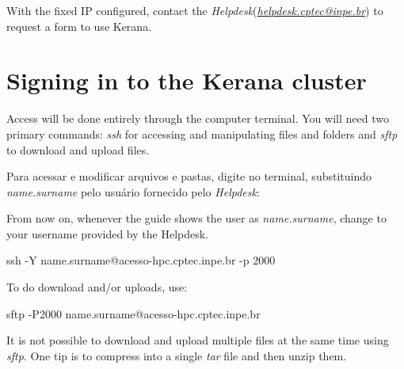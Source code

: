 \noindent With the fixed IP configured, contact the \textit{Helpdesk}(\textcolor{bleu_cite}{\href{helpdesk.cptec@inpe.br}{\textit{helpdesk.cptec@inpe.br}}}) to request a form 
to use Kerana.
\bigskip

\section{Signing in to the Kerana cluster}\label{keranaacess}
\bigskip

\noindent Access will be done entirely through the computer terminal. You will need two primary commands: \textit{ssh} for accessing and manipulating files and folders and 
\textit{sftp} to download and upload files.
\bigskip

\noindent Para acessar e modificar arquivos e pastas, digite no terminal, substituindo \textit{name.surname} pelo usuário fornecido pelo \textit{Helpdesk}:
\bigskip

\begin{tcolorbox}[enhanced,
  grow to left by   = 0cm,
  grow to right by  = 0cm,
  enlarge top by    = 0cm,
  enlarge bottom by = 0cm,
  tcbox raise base,
  boxrule           = 1.0pt,
  left              = 18mm,
  colframe          = red!50!black,coltext=red!25!black,colback=red!10!white,
  overlay           = {\begin{tcbclipinterior}\fill[red!75!blue!50!white] (frame.south west)
    rectangle node[text=white,font=\sffamily\bfseries\footnotesize,rotate=0] {WARNING} ([xshift=18mm]frame.north west);\end{tcbclipinterior}}]
    From now on, whenever the guide shows the user as \textit{name.surname}, change to your username provided by the Helpdesk.
\end{tcolorbox}
\bigskip


\begin{bashcode}
ssh -Y name.surname@acesso-hpc.cptec.inpe.br -p 2000
\end{bashcode}
\bigskip

\noindent To do download and/or uploads, use:
\bigskip

\begin{bashcode}
sftp -P2000 name.surname@acesso-hpc.cptec.inpe.br
\end{bashcode}
\bigskip

\begin{tcolorbox}[enhanced,
  grow to left by   = 0cm,
  grow to right by  = 0cm,
  enlarge top by    = 0cm,
  enlarge bottom by = 0cm,
  tcbox raise base,
  boxrule           = 1.0pt,
  left              = 18mm,
  colframe          = red!50!black,coltext=red!25!black,colback=red!10!white,
  overlay           = {\begin{tcbclipinterior}\fill[red!75!blue!50!white] (frame.south west)
    rectangle node[text=white,font=\sffamily\bfseries\footnotesize,rotate=0] {WARNING} ([xshift=18mm]frame.north west);\end{tcbclipinterior}}]
It is not possible to download and upload multiple files at the same time using \textit{sftp}. One tip is to compress into a single \textit{tar} file and then unzip them.
\end{tcolorbox}
\bigskip

